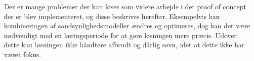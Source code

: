Der er mange problemer der kan løses som videre arbejde i det proof of concept der er blev implementeret, og disse beskrives herefter.
Eksempelvis kan kombineringen af sandsynlighedsmodeller ændres og optimeres, dog kan det være nødvendigt med en læringsperiode for at gøre løsningen mere præcis.
Udover dette kan løsningen ikke håndtere afbrudt og dårlig søvn, idet at dette ikke har været fokus.